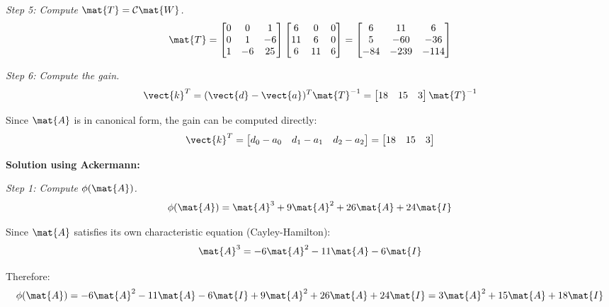 \textit{Step 5: Compute $\mat{T} = \mathcal{C}\mat{W}$.}
\begin{equation}
\mat{T} = \begin{bmatrix} 0 & 0 & 1 \\ 0 & 1 & -6 \\ 1 & -6 & 25 \end{bmatrix}
\begin{bmatrix} 6 & 0 & 0 \\ 11 & 6 & 0 \\ 6 & 11 & 6 \end{bmatrix}
= \begin{bmatrix} 6 & 11 & 6 \\ 5 & -60 & -36 \\ -84 & -239 & -114 \end{bmatrix}
\end{equation}

\textit{Step 6: Compute the gain.}
\begin{equation}
\vect{k}^T = (\vect{d} - \vect{a})^T\mat{T}^{-1} = \begin{bmatrix} 18 & 15 & 3 \end{bmatrix}\mat{T}^{-1}
\end{equation}

Since $\mat{A}$ is in canonical form, the gain can be computed directly:
\begin{equation}
\vect{k}^T = \begin{bmatrix} d_0 - a_0 & d_1 - a_1 & d_2 - a_2 \end{bmatrix}
= \begin{bmatrix} 18 & 15 & 3 \end{bmatrix}
\end{equation}

\textbf{Solution using Ackermann:}

\textit{Step 1: Compute $\phi(\mat{A})$.}
\begin{equation}
\phi(\mat{A}) = \mat{A}^3 + 9\mat{A}^2 + 26\mat{A} + 24\mat{I}
\end{equation}

Since $\mat{A}$ satisfies its own characteristic equation (Cayley-Hamilton):
\begin{equation}
\mat{A}^3 = -6\mat{A}^2 - 11\mat{A} - 6\mat{I}
\end{equation}

Therefore:
\begin{equation}
\phi(\mat{A}) = -6\mat{A}^2 - 11\mat{A} - 6\mat{I} + 9\mat{A}^2 + 26\mat{A} + 24\mat{I}
= 3\mat{A}^2 + 15\mat{A} + 18\mat{I}
\end{equation}

